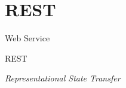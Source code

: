 \documentclass[
	9pt, %
	t, %
]{beamer}
\begin{document}

\section{REST}

\begin{frame}
	\begin{center}
		
		\bigskip\bigskip\bigskip\bigskip %
		{\Large Web Service}
		
		\bigskip\bigskip %
		{\Huge REST}
		
		\smallskip
		{\small \textit{Representational State Transfer}}
	\end{center}

\end{frame}
\end{document}
